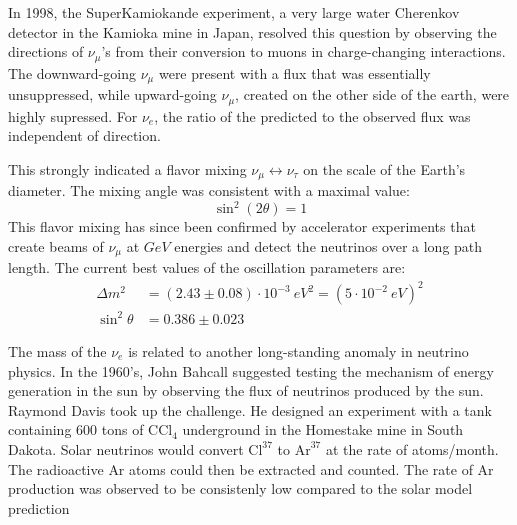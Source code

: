 \documentclass[../../main/main.tex]{subfiles}
\begin{document}
In 1998, the SuperKamiokande experiment, a very large water Cherenkov detector in the Kamioka mine in Japan, resolved this question by observing the directions of \( \nu_{\mu} \)'s from their conversion to muons in charge-changing interactions. The downward-going \( \nu_{\mu} \) were present with a flux that was essentially unsuppressed, while upward-going \( \nu_{\mu} \), created on the other side of the earth, were highly supressed. For \( \nu_{e} \), the ratio of the predicted to the observed flux was independent of direction.


This strongly indicated a flavor mixing \( \nu_{\mu} \leftrightarrow \nu_{\tau} \) on the scale of the Earth's diameter. The mixing angle was consistent with a maximal value:
\begin{equation}
	\sin^2(2\theta)
	=
	1
	\label{eq:}
\end{equation}
This flavor mixing has since been confirmed by accelerator experiments that create beams of \( \nu_{\mu} \) at \( \si{GeV} \) energies and detect the neutrinos over a long path length. The current best values of the oscillation parameters are:
\begin{align}
	\Delta m^2 &= (2.43 \pm 0.08) \cdot 10^{-3} \ \si{eV^2} = (5 \cdot 10^{-2} \ \si{eV})^2	\\
	\sin^2\theta &= 0.386 \pm 0.023
\end{align}

The mass of the \( \nu_{e} \) is related to another long-standing anomaly in neutrino physics. In the 1960's, John Bahcall suggested testing the mechanism of energy generation in the sun by observing the flux of neutrinos produced by the sun. Raymond Davis took up the challenge. He designed an experiment with a tank containing 600 tons of \( \text{CCl}_4 \) underground in the Homestake mine in South Dakota. Solar neutrinos would convert \( \text{Cl}^{37} \) to \( \text{Ar}^{37} \) at the rate of atoms/month.
The radioactive \( \text{Ar} \) atoms could then be extracted and counted. The
rate of Ar production was observed to be consistenly low compared to
the solar model prediction
\end{document}
